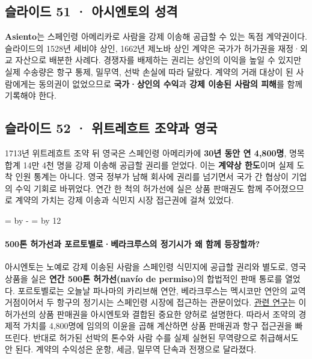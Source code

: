 \documentclass[10pt,a4paper]{article}
\newcommand{\ReserveQuestionSpace}{%
  \par\begingroup
  \dimen0=\pagegoal \advance\dimen0 by -\pagetotal
  \dimen2=\baselineskip \multiply\dimen2 by 12
  \ifdim\dimen0<\dimen2 \newpage\fi
  \endgroup}
\begin{document}
\subsection{슬라이드 51 · 아시엔토의 성격}
\textbf{Asiento}는 스페인령 아메리카로 사람을 강제 이송해 공급할 수 있는 독점 계약권이다. 슬라이드의 1528년 세비야 상인, 1662년 제노바 상인 계약은 국가가 허가권을 재정·외교 자산으로 배분한 사례다. 경쟁자를 배제하는 권리는 상인의 이익을 높일 수 있지만 실제 수송량은 항구 통제, 밀무역, 선박 손실에 따라 달랐다. 계약의 거래 대상이 된 사람에게는 동의권이 없었으므로 \textbf{국가·상인의 수익}과 \textbf{강제 이송된 사람의 피해}를 함께 기록해야 한다.\par

\subsection{슬라이드 52 · 위트레흐트 조약과 영국}
1713년 위트레흐트 조약 뒤 영국은 스페인령 아메리카에 \textbf{30년 동안 연 4,800명}, 명목 합계 14만 4천 명을 강제 이송해 공급할 권리를 얻었다. 이는 \textbf{계약상 한도}이며 실제 도착 인원 통계는 아니다. 영국 정부가 남해 회사에 권리를 넘기면서 국가 간 협상이 기업의 수익 기회로 바뀌었다. 연간 한 척의 허가선에 실은 상품 판매권도 함께 주어졌으므로 계약의 가치는 강제 이송과 식민지 시장 접근권에 걸쳐 있었다.\par

\ReserveQuestionSpace
\paragraph{500톤 허가선과 포르토벨로·베라크루스의 정기시가 왜 함께 등장할까?}

아시엔토는 노예로 강제 이송된 사람을 스페인령 식민지에 공급할 권리와 별도로, 영국 상품을 실은 \textbf{연간 500톤 허가선(navío de permiso)}의 합법적인 판매 통로를 열었다. 포르토벨로는 오늘날 파나마의 카리브해 연안, 베라크루스는 멕시코만 연안의 교역 거점이어서 두 항구의 정기시는 스페인령 시장에 접근하는 관문이었다. \href{https://www.cervantesvirtual.com/obra-visor/los-navos-anuales-de-permiso-del-asiento-de-esclavos-con-inglaterra-hasta-la-feria-de-portobelo-de-1731-0/html/02440ee0-82b2-11df-acc7-002185ce6064\_12.html}{관련 연구}는 이 허가선의 상품 판매권을 아시엔토와 결합된 중요한 양허로 설명한다. 따라서 조약의 경제적 가치를 4,800명에 임의의 이윤을 곱해 계산하면 상품 판매권과 항구 접근권을 빠뜨린다. 반대로 허가된 선박의 톤수와 사람 수를 실제 실현된 무역량으로 취급해서도 안 된다. 계약의 수익성은 운항, 세금, 밀무역 단속과 전쟁으로 달라졌다.\par
\end{document}
